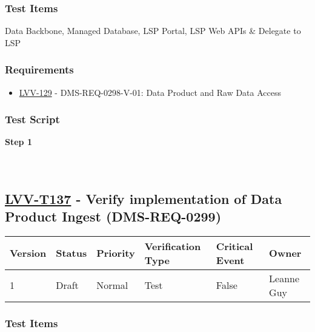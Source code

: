 \hypertarget{test-items-112}{%
\subsubsection{Test Items}\label{test-items-112}}

Data Backbone, Managed Database, LSP Portal, LSP Web APIs \& Delegate to
LSP

\hypertarget{requirements-113}{%
\subsubsection{Requirements}\label{requirements-113}}

\begin{itemize}
\tightlist
\item
  \href{https://jira.lsstcorp.org/browse/LVV-129}{LVV-129} -
  DMS-REQ-0298-V-01: Data Product and Raw Data Access
\end{itemize}

\hypertarget{test-script-113}{%
\subsubsection{Test Script}\label{test-script-113}}

\textbf{Step 1}\\
~\\
~\\

\hypertarget{lvv-t137---verify-implementation-of-data-product-ingest-dms-req-0299}{%
\subsection{\texorpdfstring{\href{https://jira.lsstcorp.org/secure/Tests.jspa\#/testCase/LVV-T137}{LVV-T137}
- Verify implementation of Data Product Ingest
(DMS-REQ-0299)}{LVV-T137 - Verify implementation of Data Product Ingest (DMS-REQ-0299)}}\label{lvv-t137---verify-implementation-of-data-product-ingest-dms-req-0299}}

\begin{longtable}[]{@{}llllll@{}}
\toprule
Version & Status & Priority & Verification Type & Critical Event &
Owner\tabularnewline
\midrule
\endhead
1 & Draft & Normal & Test & False & Leanne Guy\tabularnewline
\bottomrule
\end{longtable}

\hypertarget{test-items-113}{%
\subsubsection{Test Items}\label{test-items-113}}

